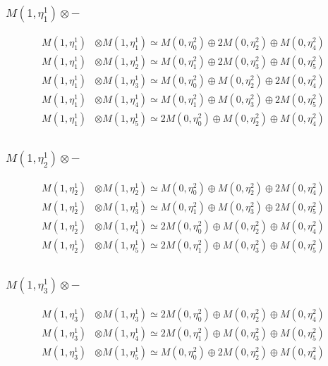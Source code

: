 \subsubsection{$ M(1,\eta^{1}_{1})\otimes -$}
\begin{align*}
M(1,\eta^{1}_{1}) &\otimes M(1,\eta^{1}_{1}) \simeq M(0,\eta^{2}_{0}) \oplus 2 M(0,\eta^{2}_{2}) \oplus M(0,\eta^{2}_{4}) \\
M(1,\eta^{1}_{1}) &\otimes M(1,\eta^{1}_{2}) \simeq M(0,\eta^{2}_{1}) \oplus 2 M(0,\eta^{2}_{3}) \oplus M(0,\eta^{2}_{5}) \\
M(1,\eta^{1}_{1}) &\otimes M(1,\eta^{1}_{3}) \simeq M(0,\eta^{2}_{0}) \oplus M(0,\eta^{2}_{2}) \oplus 2 M(0,\eta^{2}_{4}) \\
M(1,\eta^{1}_{1}) &\otimes M(1,\eta^{1}_{4}) \simeq M(0,\eta^{2}_{1}) \oplus M(0,\eta^{2}_{3}) \oplus 2 M(0,\eta^{2}_{5}) \\
M(1,\eta^{1}_{1}) &\otimes M(1,\eta^{1}_{5}) \simeq 2 M(0,\eta^{2}_{0}) \oplus M(0,\eta^{2}_{2}) \oplus M(0,\eta^{2}_{4}) \\
\end{align*}

\subsubsection{$ M(1,\eta^{1}_{2})\otimes -$}
\begin{align*}
M(1,\eta^{1}_{2}) &\otimes M(1,\eta^{1}_{2}) \simeq M(0,\eta^{2}_{0}) \oplus M(0,\eta^{2}_{2}) \oplus 2 M(0,\eta^{2}_{4}) \\
M(1,\eta^{1}_{2}) &\otimes M(1,\eta^{1}_{3}) \simeq M(0,\eta^{2}_{1}) \oplus M(0,\eta^{2}_{3}) \oplus 2 M(0,\eta^{2}_{5}) \\
M(1,\eta^{1}_{2}) &\otimes M(1,\eta^{1}_{4}) \simeq 2 M(0,\eta^{2}_{0}) \oplus M(0,\eta^{2}_{2}) \oplus M(0,\eta^{2}_{4}) \\
M(1,\eta^{1}_{2}) &\otimes M(1,\eta^{1}_{5}) \simeq 2 M(0,\eta^{2}_{1}) \oplus M(0,\eta^{2}_{3}) \oplus M(0,\eta^{2}_{5}) \\
\end{align*}

\subsubsection{$ M(1,\eta^{1}_{3})\otimes -$}
\begin{align*}
M(1,\eta^{1}_{3}) &\otimes M(1,\eta^{1}_{3}) \simeq 2 M(0,\eta^{2}_{0}) \oplus M(0,\eta^{2}_{2}) \oplus M(0,\eta^{2}_{4}) \\
M(1,\eta^{1}_{3}) &\otimes M(1,\eta^{1}_{4}) \simeq 2 M(0,\eta^{2}_{1}) \oplus M(0,\eta^{2}_{3}) \oplus M(0,\eta^{2}_{5}) \\
M(1,\eta^{1}_{3}) &\otimes M(1,\eta^{1}_{5}) \simeq M(0,\eta^{2}_{0}) \oplus 2 M(0,\eta^{2}_{2}) \oplus M(0,\eta^{2}_{4}) \\
\end{align*}

